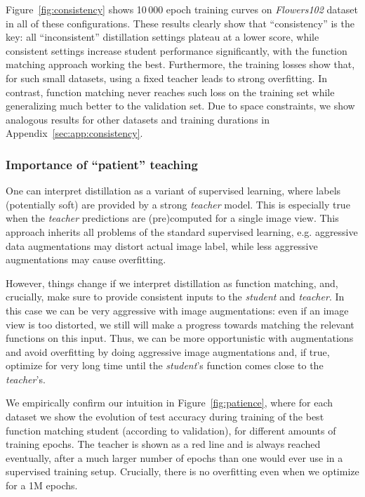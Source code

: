 \documentclass[10pt,twocolumn,letterpaper]{article}
\begin{document}
Figure~\ref{fig:consistency} shows 10\,000 epoch training curves on \emph{Flowers102} dataset in all of these configurations.
These results clearly show that ``consistency'' is the key: all ``inconsistent'' distillation settings plateau at a lower score, while consistent settings increase student performance significantly, with the function matching approach working the best.
Furthermore, the training losses show that, for such small datasets, using a fixed teacher leads to strong overfitting. In contrast, function matching never reaches such loss on the training set while generalizing much better to the validation set.
Due to space constraints, we show analogous results for other datasets and training durations in Appendix~\ref{sec:app:consistency}.

\subsubsection{Importance of ``patient'' teaching}

One can interpret distillation as a variant of supervised learning, where labels (potentially soft) are provided by a strong \emph{teacher} model. This is especially true when the \emph{teacher} predictions are (pre)computed for a single image view. This approach inherits all problems of the standard supervised learning, e.g. aggressive data augmentations may distort actual image label, while less aggressive augmentations may cause overfitting.

However, things change if we interpret distillation as function matching, and, crucially, make sure to provide consistent inputs to the \emph{student} and \emph{teacher}. In this case we can be very aggressive with image augmentations: even if an image view is too distorted, we still will make a progress towards matching the relevant functions on this input. Thus, we can be more opportunistic with augmentations and avoid overfitting by doing aggressive image augmentations and, if true, optimize for very long time until the \emph{student}'s function comes close to the \emph{teacher}'s. 

We empirically confirm our intuition in Figure~\ref{fig:patience}, where for each dataset we show the evolution of test accuracy during training of the best function matching student (according to validation), for different amounts of training epochs.
The teacher is shown as a red line and is always reached eventually, after a much larger number of epochs than one would ever use in a supervised training setup.
Crucially, there is no overfitting even when we optimize for a 1M epochs.
\end{document}
